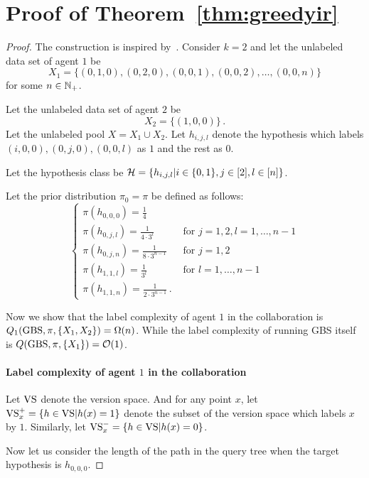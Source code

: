 \section{Proof of Theorem~\ref{thm:greedyir}}\label{app:greedyir}
\begin{proof}
    The construction is inspired by~\cite{dasgupta2004analysis}.
    Consider $k=2$ and let the unlabeled data set of agent $1$ be 
    \[X_1 = \{(0,1,0),(0,2,0), (0,0,1), (0,0,2),\ldots, (0,0,n)\}\]
    for some $n\in {\mathbb N}_+$.
    
    Let  the unlabeled data set of 
    agent $2$ be
    \[X_2 = \{(1,0,0)\}\,.\]
    Let the unlabeled pool $X = X_1\cup X_2$.
    Let $h_{i,j,l}$ denote the hypothesis which labels $(i,0,0),(0,j,0),(0,0,l)$ as $1$ and the rest as $0$.
    
    Let the hypothesis class be $\mathcal{H} = \{h_{i,j,l}|i\in \{0,1\}, j\in [2], l\in [n]\}$.
    
    Let the prior distribution $\pi_0 = \pi$ be defined as follows:
    \begin{equation*}
        \begin{cases}
            \pi(h_{0,0,0}) = \frac{1}{4}&\\
            \pi(h_{0,j,l}) = \frac{1}{4 \cdot 3^l}& \text{ for } j=1,2, l=1,\ldots,n-1\\
            \pi(h_{0,j,n}) = \frac{1}{8\cdot 3^{n-1}}& \text{ for } j=1,2\\
            \pi(h_{1,1,l}) = \frac{1}{3^l}& \text{ for } l=1,\ldots,n-1\\
            \pi(h_{1,1,n}) = \frac{1}{2\cdot 3^{n-1}}\,.&
        \end{cases}
    \end{equation*}
   
    
    Now we show that the label complexity of agent $1$ in the collaboration is $Q_1(\textrm{GBS}, \pi, \{X_1,X_2\}) = \Omega(n)$. While the label complexity of running GBS itself is $Q(\textrm{GBS},\pi, \{X_1\}) = \mathcal{O}(1)$.

    \paragraph{Label complexity of agent $1$ in the collaboration} Let $\mathrm{VS}$ denote the version space. And for any point $x$, let $\mathrm{VS}_{x}^+ = \{h\in \mathrm{VS}|h(x) =1\}$ denote the subset of the version space which labels $x$ by $1$. Similarly, let $\mathrm{VS}_{x}^- = \{h\in \mathrm{VS}|h(x) =0\}$.

    Now let us consider the length of the %
    path in the query tree when the target hypothesis is $h_{0,0,0}$.
    

\end{proof}
